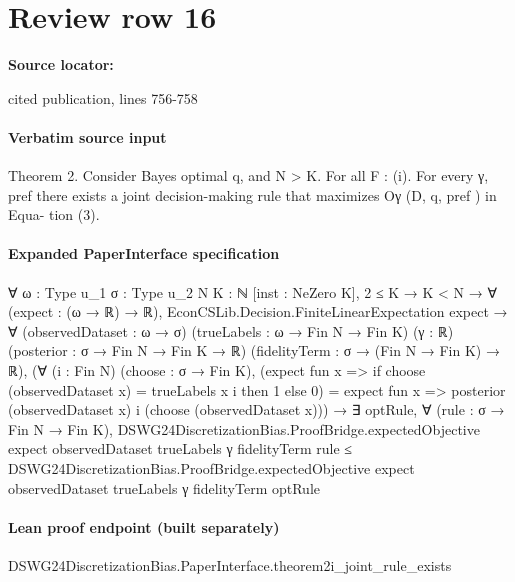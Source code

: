 \documentclass[10pt]{article}
\begin{document}
\section*{Review row 16}
\textbf{Source locator:} {\footnotesize\raggedright cited publication, lines 756-\allowbreak{}758\par}
\paragraph{Verbatim source input}
\begin{ReviewVerbatim}
Theorem 2. Consider Bayes optimal q, and N > K. For all F :
   (i). For every γ, pref there exists a joint decision-making rule that maximizes Oγ (D, q, pref ) in Equa-
        tion (3).
\end{ReviewVerbatim}


\paragraph{Expanded PaperInterface specification}
\begin{ReviewVerbatim}
∀ {ω : Type u_1} {σ : Type u_2} {N K : ℕ} [inst : NeZero K],
  2 ≤ K →
    K < N →
      ∀ (expect : (ω → ℝ) → ℝ),
        EconCSLib.Decision.FiniteLinearExpectation expect →
          ∀ (observedDataset : ω → σ) (trueLabels : ω → Fin N → Fin K) (γ : ℝ) (posterior : σ → Fin N → Fin K → ℝ)
            (fidelityTerm : σ → (Fin N → Fin K) → ℝ),
            (∀ (i : Fin N) (choose : σ → Fin K),
                (expect fun x => if choose (observedDataset x) = trueLabels x i then 1 else 0) =
                  expect fun x => posterior (observedDataset x) i (choose (observedDataset x))) →
              ∃ optRule,
                ∀ (rule : σ → Fin N → Fin K),
                  DSWG24DiscretizationBias.ProofBridge.expectedObjective expect observedDataset trueLabels γ
                      fidelityTerm rule ≤
                    DSWG24DiscretizationBias.ProofBridge.expectedObjective expect observedDataset trueLabels γ
                      fidelityTerm optRule
\end{ReviewVerbatim}

\paragraph{Lean proof endpoint (built separately)}\begin{ReviewVerbatim}
DSWG24DiscretizationBias.PaperInterface.theorem2i_joint_rule_exists
\end{ReviewVerbatim}
\end{document}
